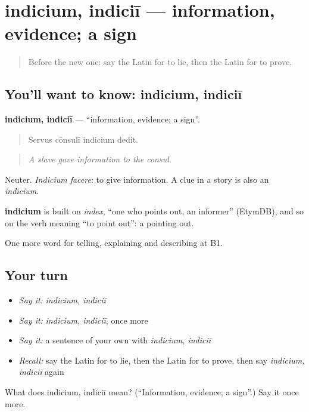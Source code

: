 \section[indicium, indiciī]{indicium, indiciī — information, evidence; a sign}

\label{lesson:LA-C310-indicium}



\begin{quote}
Before the new one: say the Latin for to lie, then the Latin for to prove.
\end{quote}

\subsection*{You'll want to know: indicium, indiciī}
\textbf{indicium, indiciī} — \textquotedblleft{}information, evidence; a sign\textquotedblright{}.

\begin{quote}
Servus cōnsulī indicium dedit.
\end{quote}

\begin{quote}
\emph{A slave gave information to the consul.}
\end{quote}

Neuter. \emph{Indicium facere}: to give information. A clue in a story is also an \emph{indicium}.

\begin{cousinweb}
\textbf{indicium} is built on \emph{index}, \textquotedblleft{}one who points out, an informer\textquotedblright{} (EtymDB), and so on the verb meaning \textquotedblleft{}to point out\textquotedblright{}: a pointing out.
\end{cousinweb}

\begin{grammarlens}[title={What you've built}]
One more word for telling, explaining and describing at B1.
\end{grammarlens}

\subsection*{Your turn}
\begin{itemize}
\raggedright
  \item \emph{Say it:} \emph{indicium, indiciī}
  \item \emph{Say it:} \emph{indicium, indiciī}, once more
  \item \emph{Say it:} a sentence of your own with \emph{indicium, indiciī}
  \item \emph{Recall:} say the Latin for to lie, then the Latin for to prove, then say \emph{indicium, indiciī} again
\end{itemize}

\begin{tcolorbox}[breakable,colback=teal!4,colframe=teal!35!black,title={Before you move on}]
What does indicium, indiciī mean? (\textquotedblleft{}Information, evidence; a sign\textquotedblright{}.) Say it once more.
\end{tcolorbox}
